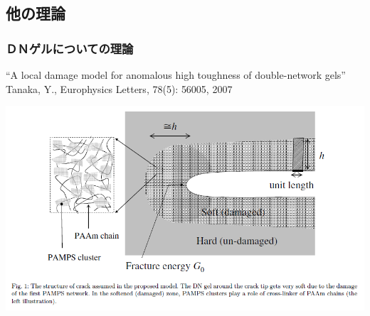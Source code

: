 \documentclass[11pt, dvipdfmx]{beamer}
\begin{document}
\begin{frame}
\end{frame}

\subsection{他の理論}
\begin{frame}
\frametitle{ＤＮゲルについての理論}

``A local damage model for anomalous high toughness of double-network gels''\\
Tanaka, Y., Europhysics Letters, 78(5): 56005, 2007

\includegraphics[width=\textwidth]{fig/tanaka.png}
\end{frame}
\end{document}
